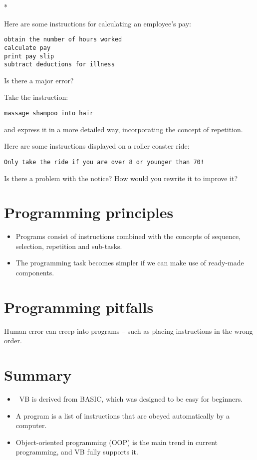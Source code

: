 		\begin{stqb}*
			\begin{STQ}
				\item Here are some instructions for calculating an employee’s pay:
					\begin{lstlisting}
obtain the number of hours worked
calculate pay
print pay slip
subtract deductions for illness
					\end{lstlisting}
					Is there a major error?
				\item Take the instruction:
					\begin{lstlisting}
massage shampoo into hair
					\end{lstlisting}
					and express it in a more detailed way, incorporating the concept of repetition.
				\item Here are some instructions displayed on a roller coaster ride:
					\begin{lstlisting}
Only take the ride if you are over 8 or younger than 70!
					\end{lstlisting}
					Is there a problem with the notice? How would you rewrite it to improve it?
			\end{STQ}
		\end{stqb}

	\section{Programming principles}
		\begin{itemize}
			\item Programs consist of instructions combined with the concepts of sequence, selection, repetition and sub-tasks.
			\item The programming task becomes simpler if we can make use of ready-made components.
		\end{itemize}

	\section{Programming pitfalls}
		Human error can creep into programs – such as placing instructions in the wrong order.
		
	\section{Summary}
		\begin{itemize}
			\item VB is derived from BASIC, which was designed to be easy for beginners.
			\item A program is a list of instructions that are obeyed automatically by a computer.
			\item Object-oriented programming (OOP) is the main trend in current programming, and VB fully supports it.
		\end{itemize}

